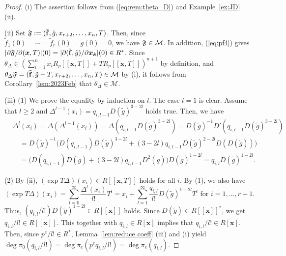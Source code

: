 \documentclass{amsart}
\theoremstyle{plain}
\theoremstyle{definition}
\newcommand{\x}{{\boldsymbol x}}
\newcommand{\bk}{{\boldsymbol k}}
\newcommand{\ff}{{\bf f}}
\newcommand{\Rx}{R[\x]}
\newcommand{\degw  }{\deg}
\begin{document}
\begin{proof}
(i) 
The assertion follows from 
(\ref{eq:rem:theta_D}) 
and Example~\ref{ex:JD} (ii). 




(ii) 
Set $\frak{F}:=(\tilde{\ff} ,\tilde{g},x_{r+2},\ldots ,x_n,T)$. 
Then, 
since $\tilde{f}_1(0)=\cdots =\tilde{f}_r(0)=\tilde{g}(0)=0$, 
we have $\frak{F}\in \mathcal{M}$. 
In addition, 
(\ref{eq:pf4}) gives $|\partial \frak{F}/\partial (\x ,T)|(0)=
|\partial (\tilde{\ff },\tilde{g})/\partial \x _{\bk }|(0)
\in R^*$. 
Since $\theta _{\Delta }\in 
(\sum _{i=1}^nx_iR_p[[\x ,T]]+TR_p[[\x ,T]])^{n+1}$ 
by definition, 
and 
$\theta _{\Delta }\mathfrak{F}
=(\tilde{\ff} ,\tilde{g}+T,x_{r+2},\ldots ,x_n,T)\in \mathcal{M}$ 
by (i), 
it follows from Corollary~\ref{lem:2023Feb} 
that $\theta _{\Delta }\in \mathcal{M}$. 



(iii) 
(1) We prove the equality by induction on $l$. 
The case $l=1$ is clear. 
Assume that $l\ge 2$ and 
$\Delta ^{l-1}(x_i)=q_{i,l-1}D(\tilde{g})^{3-2l}$ 
holds true. 
Then, 
we have
\begin{align*}
&\Delta ^l(x_i)
=\Delta (\Delta ^{l-1}(x_i))
=\Delta (q_{i,l-1}D(\tilde{g})^{3-2l})
=D(\tilde{g})^{-1}D'(q_{i,l-1}D(\tilde{g})^{3-2l}) \\
&\quad 
=D(\tilde{g})^{-1}
\bigl(D(q_{i,l-1})D(\tilde{g})^{3-2l}
+(3-2l)q_{i,l-1}D(\tilde{g})^{2-2l}
D(D(\tilde{g}))\bigr) \\
&\quad =
\bigl( 
D(q_{i,l-1})D(\tilde{g})+(3-2l)
q_{i,l-1}D^2(\tilde{g})
\bigr) D(\tilde{g})^{1-2l}
=q_{i,l}D(\tilde{g})^{1-2l}. 
\end{align*}



(2) By (ii), 
$(\exp T\Delta )(x_i)\in R[[\x ,T]]$ holds for all $i$. 
By (1), we also have 
\begin{equation}\label{eq:pf6}
(\exp T\Delta )(x_i)
=\sum _{l=0}^\infty \dfrac{\Delta ^l(x_i)}{l!}T^l
=x_i+\sum _{l=1}^\infty \dfrac{q_{i,l}}{l!}D(\tilde{g})^{1-2l}T^l 
\text{ \ for \ }i=1,\ldots ,r+1. 
\end{equation}
Thus, $(q_{i,l}/l!)D(\tilde{g})^{1-2l}\in R[[\x ]]$ holds. 
Since 
$D(\tilde{g})\in R[[\x ]]^*$, 
we get $q_{i,l}/l!\in R[[\x ]]$. 
This together with $q_{i,l}\in \Rx $ 
implies that $q_{i,l}/l!\in \Rx $. 
Then, 
since $p^e/l!\in R^*$, 
Lemma~\ref{lem:reduce coeff} (iii) and (i) 
yield 
$\degw \pi _0(q_{i,l}/l!)=\degw \pi _e(p^eq_{i,l}/l!)
=\degw \pi _e(q_{i,l})$. 
\end{proof}
\end{document}
